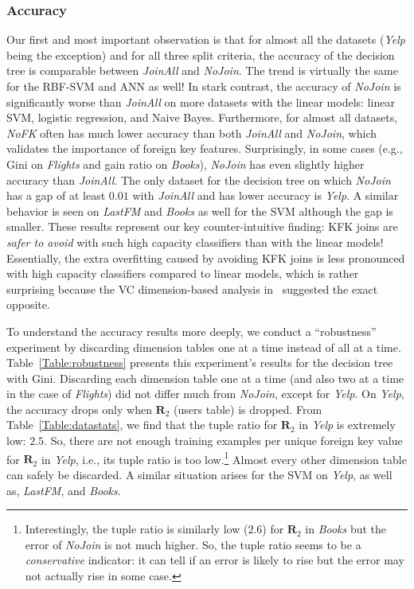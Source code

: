 \documentclass{vldb}
\begin{document}
\subsubsection*{Accuracy}
Our first and most important observation is that for almost all the datasets (\textit{Yelp} being the exception) and for all three split criteria, the accuracy of the decision tree 
is comparable between \textit{JoinAll} and \textit{NoJoin}. The trend is virtually the same for the RBF-SVM and ANN as well! In stark contrast, 
the accuracy of \textit{NoJoin} is significantly worse than \textit{JoinAll} on more datasets with the linear models: linear SVM, logistic regression, and Naive Bayes.
Furthermore, for almost all datasets, \textit{NoFK} often has much lower accuracy than both \textit{JoinAll} and \textit{NoJoin}, which validates the importance 
of foreign key features.
Surprisingly, in some cases (e.g., Gini on \textit{Flights} and gain ratio on \textit{Books}), \textit{NoJoin} has even slightly higher accuracy than \textit{JoinAll}.
The only dataset for the decision tree on which \textit{NoJoin} has a gap of at least $0.01$ with \textit{JoinAll} and has lower accuracy is \textit{Yelp}. 
A similar behavior is seen on \textit{LastFM} and \textit{Books} as well for the SVM although the gap is smaller.
These results represent our key counter-intuitive finding: KFK joins are \textit{safer to avoid} with such high capacity classifiers than with the linear models!
Essentially, the extra overfitting caused by avoiding KFK joins is less pronounced with high capacity classifiers compared to linear models, which is rather surprising
because the VC dimension-based analysis in~\cite{hamlet} suggested the exact opposite.

To understand the accuracy results more deeply, we conduct a ``robustness'' experiment by discarding dimension tables one at a time instead of all at a time.
Table~\ref{Table:robustness} presents this experiment's results for the decision tree with Gini.
Discarding each dimension table one at a time (and also two at a time in the case of \textit{Flights}) did not differ much from \textit{NoJoin}, except for \textit{Yelp}.
On \textit{Yelp}, the accuracy drops only when $\textbf{R}_2$ (users table) is dropped. From Table~\ref{Table:datastats}, we find that the tuple ratio for $\textbf{R}_2$ in 
\textit{Yelp} is extremely low: $2.5$. So, there are not enough training examples per unique foreign key value for $\textbf{R}_2$ in \textit{Yelp}, i.e., its tuple ratio is too 
low.\footnote{Interestingly, the tuple ratio is similarly low ($2.6$) for $\textbf{R}_2$ in \textit{Books} but the error of \textit{NoJoin} is not much higher. So, the tuple 
ratio seems to be a \textit{conservative} indicator: it can tell if an error is likely to rise but the error may not actually rise in some case.}
Almost every other dimension table can safely be discarded. A similar situation arises for the SVM on \textit{Yelp}, as well as, \textit{LastFM}, and \textit{Books}. 
\end{document}
